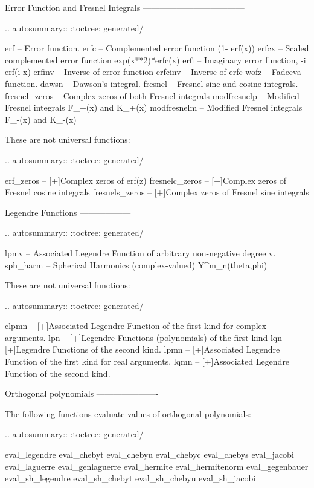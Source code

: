 \begin{DoxyVerb}
Error Function and Fresnel Integrals
------------------------------------

.. autosummary::
   :toctree: generated/

   erf           -- Error function.
   erfc          -- Complemented error function (1- erf(x))
   erfcx         -- Scaled complemented error function exp(x**2)*erfc(x)
   erfi          -- Imaginary error function, -i erf(i x)
   erfinv        -- Inverse of error function
   erfcinv       -- Inverse of erfc
   wofz          -- Fadeeva function.
   dawsn         -- Dawson's integral.
   fresnel       -- Fresnel sine and cosine integrals.
   fresnel_zeros -- Complex zeros of both Fresnel integrals
   modfresnelp   -- Modified Fresnel integrals F_+(x) and K_+(x)
   modfresnelm   -- Modified Fresnel integrals F_-(x) and K_-(x)

These are not universal functions:

.. autosummary::
   :toctree: generated/

   erf_zeros      -- [+]Complex zeros of erf(z)
   fresnelc_zeros -- [+]Complex zeros of Fresnel cosine integrals
   fresnels_zeros -- [+]Complex zeros of Fresnel sine integrals

Legendre Functions
------------------

.. autosummary::
   :toctree: generated/

   lpmv     -- Associated Legendre Function of arbitrary non-negative degree v.
   sph_harm -- Spherical Harmonics (complex-valued) Y^m_n(theta,phi)

These are not universal functions:

.. autosummary::
   :toctree: generated/

   clpmn    -- [+]Associated Legendre Function of the first kind for complex arguments.
   lpn      -- [+]Legendre Functions (polynomials) of the first kind
   lqn      -- [+]Legendre Functions of the second kind.
   lpmn     -- [+]Associated Legendre Function of the first kind for real arguments.
   lqmn     -- [+]Associated Legendre Function of the second kind.

Orthogonal polynomials
----------------------

The following functions evaluate values of orthogonal polynomials:

.. autosummary::
   :toctree: generated/

   eval_legendre
   eval_chebyt
   eval_chebyu
   eval_chebyc
   eval_chebys
   eval_jacobi
   eval_laguerre
   eval_genlaguerre
   eval_hermite
   eval_hermitenorm
   eval_gegenbauer
   eval_sh_legendre
   eval_sh_chebyt
   eval_sh_chebyu
   eval_sh_jacobi


\end{DoxyVerb}
